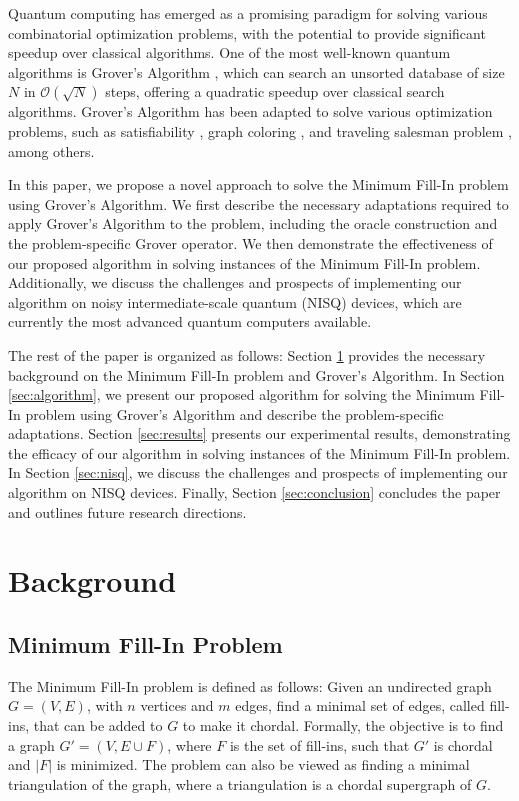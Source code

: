 Quantum computing has emerged as a promising paradigm for solving various combinatorial optimization problems, with the potential to provide significant speedup over classical algorithms. One of the most well-known quantum algorithms is Grover's Algorithm \cite{grover1996fast}, which can search an unsorted database of size $N$ in $\mathcal{O}(\sqrt{N})$ steps, offering a quadratic speedup over classical search algorithms. Grover's Algorithm has been adapted to solve various optimization problems, such as satisfiability \cite{brassard1998quantum}, graph coloring \cite{childs2000quantum}, and traveling salesman problem \cite{daskin2012quantum}, among others.

In this paper, we propose a novel approach to solve the Minimum Fill-In problem using Grover's Algorithm. We first describe the necessary adaptations required to apply Grover's Algorithm to the problem, including the oracle construction and the problem-specific Grover operator. We then demonstrate the effectiveness of our proposed algorithm in solving instances of the Minimum Fill-In problem. Additionally, we discuss the challenges and prospects of implementing our algorithm on noisy intermediate-scale quantum (NISQ) devices, which are currently the most advanced quantum computers available.

The rest of the paper is organized as follows: Section \ref{sec:background} provides the necessary background on the Minimum Fill-In problem and Grover's Algorithm. In Section \ref{sec:algorithm}, we present our proposed algorithm for solving the Minimum Fill-In problem using Grover's Algorithm and describe the problem-specific adaptations. Section \ref{sec:results} presents our experimental results, demonstrating the efficacy of our algorithm in solving instances of the Minimum Fill-In problem. In Section \ref{sec:nisq}, we discuss the challenges and prospects of implementing our algorithm on NISQ devices. Finally, Section \ref{sec:conclusion} concludes the paper and outlines future research directions.

\section{Background}
\label{sec:background}

\subsection{Minimum Fill-In Problem}

The Minimum Fill-In problem is defined as follows: Given an undirected graph $G = (V, E)$, with $n$ vertices and $m$ edges, find a minimal set of edges, called fill-ins, that can be added to $G$ to make it chordal. Formally, the objective is to find a graph $G' = (V, E \cup F)$, where $F$ is the set of fill-ins, such that $G'$ is chordal and $|F|$ is minimized. The problem can also be viewed as finding a minimal triangulation of the graph, where a triangulation is a chordal supergraph of $G$.

